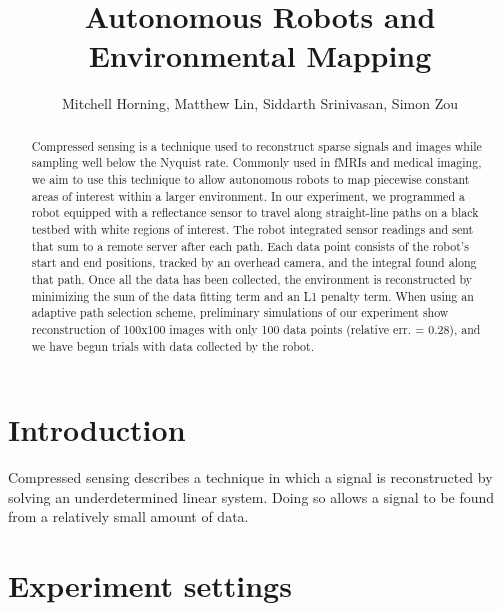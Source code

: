 \documentclass[english]{article}\usepackage[]{graphicx}\usepackage[]{color}
\begin{document}
\title{Autonomous Robots and Environmental Mapping}

\author{Mitchell Horning, Matthew Lin, Siddarth Srinivasan, Simon Zou}

\maketitle

\begin{abstract}

Compressed sensing is a technique used to reconstruct sparse signals and images while sampling well below the Nyquist rate. Commonly used in fMRIs and medical imaging, we aim to use this technique to allow autonomous robots to map piecewise constant areas of interest within a larger environment. In our experiment, we programmed a robot equipped with a reflectance sensor to travel along straight-line paths on a black testbed with white regions of interest. The robot integrated sensor readings and sent that sum to a remote server after each path. Each data point consists of the robot's start and end positions, tracked by an overhead camera, and the integral found along that path. Once all the data has been collected, the environment is reconstructed by minimizing the sum of the data fitting term and an L1 penalty term. When using an adaptive path selection scheme, preliminary simulations of our experiment show reconstruction of 100x100 images with only 100 data points (relative err. = 0.28), and we have begun trials with data collected by the robot.

\end{abstract}

\tableofcontents

\section{Introduction}

Compressed sensing describes a technique in which a signal is reconstructed by 
solving an underdetermined linear system. Doing so allows a signal to be 
found from a relatively small amount of data.

\section{Experiment settings}
\end{document}
